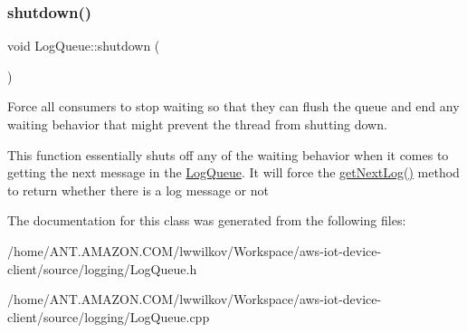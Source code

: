 \subsubsection{\texorpdfstring{shutdown()}{shutdown()}}
{\footnotesize\ttfamily void Log\+Queue\+::shutdown (\begin{DoxyParamCaption}{ }\end{DoxyParamCaption})}



Force all consumers to stop waiting so that they can flush the queue and end any waiting behavior that might prevent the thread from shutting down. 

This function essentially shuts off any of the \textquotesingle{}waiting\textquotesingle{} behavior when it comes to getting the next message in the \hyperlink{class_aws_1_1_iot_1_1_device_client_1_1_logging_1_1_log_queue}{Log\+Queue}. It will force the \hyperlink{class_aws_1_1_iot_1_1_device_client_1_1_logging_1_1_log_queue_a0db76ccf436b508b17d82fccaff63eb4}{get\+Next\+Log()} method to return whether there is a log message or not 

The documentation for this class was generated from the following files\+:\begin{DoxyCompactItemize}
\item 
/home/\+A\+N\+T.\+A\+M\+A\+Z\+O\+N.\+C\+O\+M/lwwilkov/\+Workspace/aws-\/iot-\/device-\/client/source/logging/Log\+Queue.\+h\item 
/home/\+A\+N\+T.\+A\+M\+A\+Z\+O\+N.\+C\+O\+M/lwwilkov/\+Workspace/aws-\/iot-\/device-\/client/source/logging/Log\+Queue.\+cpp\end{DoxyCompactItemize}
